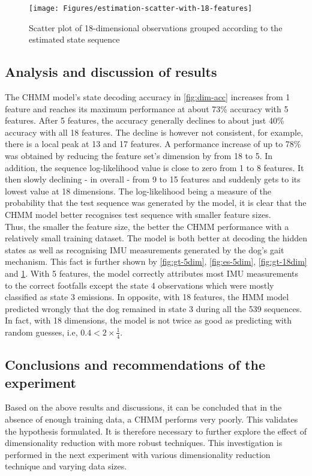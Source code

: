 \begin{figure}[ht!]
	\texttt{[image: Figures/estimation-scatter-with-18-features]}
	\caption{Scatter plot of 18-dimensional observations grouped according to the estimated state sequence}
	\label{fig:es-18dim}
\end{figure}

\subsection{Analysis and discussion of results}

The CHMM model's state decoding accuracy in \ref{fig:dim-acc} increases from 1 feature and reaches its maximum performance at about 73\% accuracy with 5 features. After 5 features, the accuracy generally declines to about just 40\% accuracy with all 18 features. The decline is however not consistent, for example, there is a local peak at 13 and 17 features.
A performance increase of up to 78\% was obtained by reducing the feature set's dimension by from 18 to 5.
In addition, the sequence log-likelihood value is close to zero from 1 to 8 features. It then slowly declining - in overall - from 9 to 15 features and suddenly gets to its lowest value at 18 dimensions.
The log-likelihood being a measure of the probability that the test sequence was generated by the model, it is clear that the CHMM model better recognises test sequence with smaller feature sizes.\\
Thus, the smaller the feature size, the better the CHMM performance with a relatively small training dataset. The model is both better at decoding the hidden states as well as recognising IMU measurements generated by the dog's gait mechanism.
This fact is further shown by \ref{fig:gt-5dim}, \ref{fig:es-5dim}, \ref{fig:gt-18dim} and \ref{fig:es-18dim}. With 5 features, the model correctly attributes most IMU measurements to the correct footfalls except the state 4 observations which were mostly classified as state 3 emissions. In opposite, with 18 features, the HMM model predicted wrongly that the dog remained in state 3 during all the 539 sequences. In fact, with 18 dimensions, the model is not twice as good as predicting with random guesses, i.e, \(0.4 < 2\times\frac{1}{4}\).

\subsection{Conclusions and recommendations of the experiment}
Based on the above results and discussions, it can be concluded that in the absence of enough training data, a CHMM performs very poorly. This validates the hypothesis formulated. It is therefore necessary to further explore the effect of dimensionality reduction with more robust techniques. This investigation is performed in the next experiment with various dimensionality reduction technique and varying data sizes.

